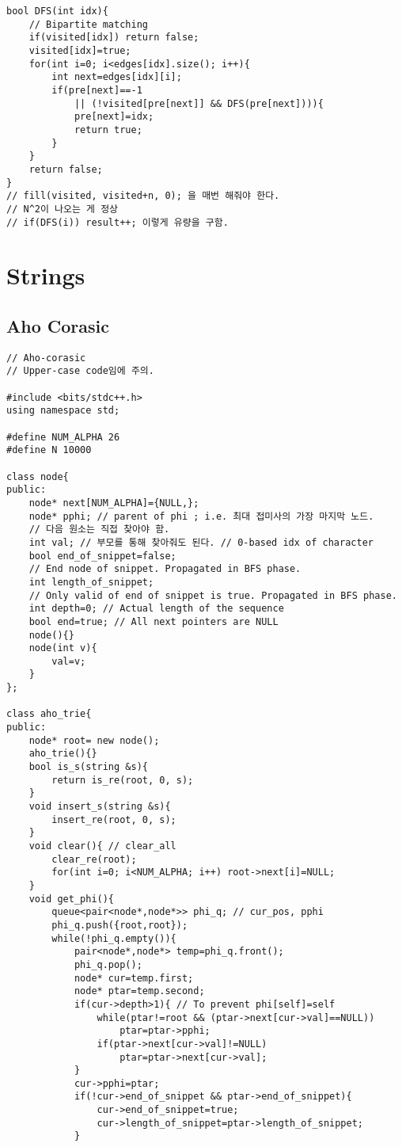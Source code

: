 \documentclass[10pt, landscape]{article}
\begin{document}
\begin{multicols}{2}
\begin{verbatim}
bool DFS(int idx){
    // Bipartite matching
    if(visited[idx]) return false;
    visited[idx]=true;
    for(int i=0; i<edges[idx].size(); i++){
        int next=edges[idx][i];
        if(pre[next]==-1 
            || (!visited[pre[next]] && DFS(pre[next]))){
            pre[next]=idx;
            return true;
        }
    }
    return false;
}
// fill(visited, visited+n, 0); 을 매번 해줘야 한다.
// N^2이 나오는 게 정상
// if(DFS(i)) result++; 이렇게 유량을 구함.
\end{verbatim}


\section{Strings}
\subsection{Aho Corasic}
\begin{verbatim}
// Aho-corasic
// Upper-case code임에 주의.

#include <bits/stdc++.h>
using namespace std;

#define NUM_ALPHA 26
#define N 10000

class node{
public:
    node* next[NUM_ALPHA]={NULL,};
    node* pphi; // parent of phi ; i.e. 최대 접미사의 가장 마지막 노드. 
    // 다음 원소는 직접 찾아야 함.
    int val; // 부모를 통해 찾아줘도 된다. // 0-based idx of character
    bool end_of_snippet=false; 
    // End node of snippet. Propagated in BFS phase.
    int length_of_snippet; 
    // Only valid of end of snippet is true. Propagated in BFS phase.
    int depth=0; // Actual length of the sequence
    bool end=true; // All next pointers are NULL
    node(){}
    node(int v){
        val=v; 
    }
};

class aho_trie{
public:
    node* root= new node();
    aho_trie(){}
    bool is_s(string &s){
        return is_re(root, 0, s);
    }
    void insert_s(string &s){
        insert_re(root, 0, s);
    }
    void clear(){ // clear_all
        clear_re(root);
        for(int i=0; i<NUM_ALPHA; i++) root->next[i]=NULL;
    }
    void get_phi(){
        queue<pair<node*,node*>> phi_q; // cur_pos, pphi
        phi_q.push({root,root});
        while(!phi_q.empty()){
            pair<node*,node*> temp=phi_q.front();
            phi_q.pop();
            node* cur=temp.first;
            node* ptar=temp.second;
            if(cur->depth>1){ // To prevent phi[self]=self
                while(ptar!=root && (ptar->next[cur->val]==NULL)) 
                    ptar=ptar->pphi;
                if(ptar->next[cur->val]!=NULL) 
                    ptar=ptar->next[cur->val];
            }
            cur->pphi=ptar;
            if(!cur->end_of_snippet && ptar->end_of_snippet){
                cur->end_of_snippet=true;
                cur->length_of_snippet=ptar->length_of_snippet;
            }


\end{verbatim}
\end{multicols}
\end{document}
